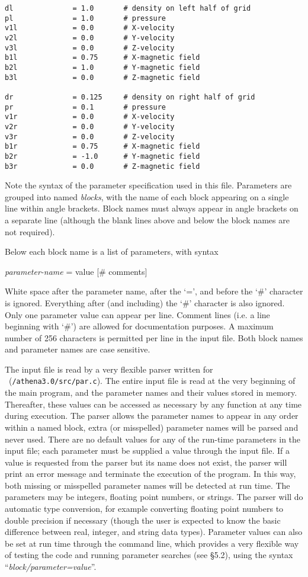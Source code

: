 \begin{verbatim}
dl              = 1.0       # density on left half of grid
pl              = 1.0       # pressure
v1l             = 0.0       # X-velocity
v2l             = 0.0       # Y-velocity
v3l             = 0.0       # Z-velocity
b1l             = 0.75      # X-magnetic field
b2l             = 1.0       # Y-magnetic field
b3l             = 0.0       # Z-magnetic field

dr              = 0.125     # density on right half of grid
pr              = 0.1       # pressure
v1r             = 0.0       # X-velocity
v2r             = 0.0       # Y-velocity
v3r             = 0.0       # Z-velocity
b1r             = 0.75      # X-magnetic field
b2r             = -1.0      # Y-magnetic field
b3r             = 0.0       # Z-magnetic field
\end{verbatim}
\normalsize

Note the syntax of the parameter specification used in this file.
Parameters are grouped into named {\it blocks}, with the name of each
block appearing on a single line within angle brackets.  Block names
must always appear in angle brackets on a separate line (although the
blank lines above and below the block names are not required).

Below each block name is a list of parameters, with syntax
\begin{center}
 {\it parameter-name} = value [\# comments]
\end{center}
White space after the parameter name, after the `=', and before the
`\#' character is ignored.  Everything after (and including) the `\#'
character is also ignored.  Only one parameter value can appear per
line.  Comment lines (i.e. a line beginning with `\#') are allowed for
documentation purposes.  A maximum number of 256 characters is permitted
per line in the input file.  Both block names and parameter names are
case sensitive.

The input file is read by a very flexible parser written for \ath\
({\tt /athena3.0/src/par.c}).  The entire input file is read at the
very beginning of the main program, and the parameter names and their
values stored in memory.  Thereafter, these values can be accessed as
necessary by any function at any time during execution.  The parser
allows the parameter names to appear in any order within a named
block, extra (or misspelled) parameter names will be parsed and never
used.  There are no default values for any of the run-time parameters
in the input file; each parameter must be supplied a value through the
input file.  If a value is requested from the parser but its name does
not exist, the parser will print an error message and terminate the
execution of the program.  In this way, both missing or misspelled
parameter names will be detected at run time.  The parameters may be
integers, floating point numbers, or strings.  The parser will do
automatic type conversion, for example converting floating point
numbers to double precision if necessary (though the user is expected
to know the basic difference between real, integer, and string data
types).  Parameter values can also be set at run time through the
command line, which provides a very flexible way of testing the code
and running parameter searches (see \S 5.2),
using the syntax ``{\it block/parameter=value}''.


